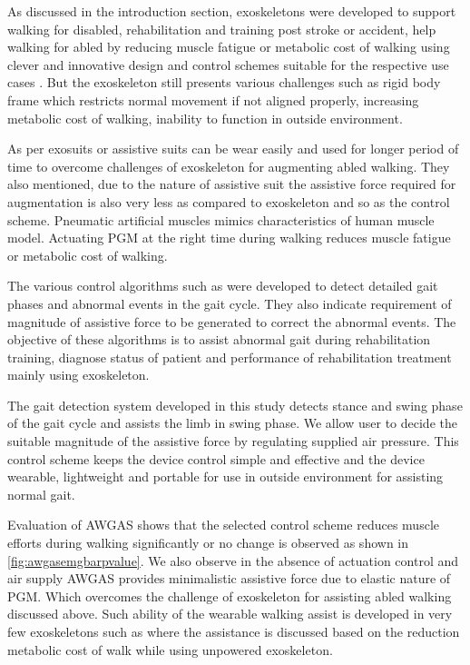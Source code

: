 \documentclass[paper,JRM,paper]{jaciiiarticle}
\begin{document}
As discussed in the introduction section, exoskeletons were developed to support walking for disabled, rehabilitation and training post stroke or accident, help walking for abled by reducing muscle fatigue or metabolic cost of walking using clever and innovative design and control schemes suitable for the respective use cases \cite{24}. But the exoskeleton still presents various challenges such as rigid body frame which restricts normal movement if not aligned properly, increasing metabolic cost of walking, inability to function in outside environment. 

As per \cite{25} exosuits or assistive suits can be wear easily and used for longer period of time to overcome challenges of exoskeleton for augmenting abled walking. They also mentioned, due to the nature of assistive suit the assistive force required for augmentation is also very less as compared to exoskeleton and so as the control scheme. Pneumatic artificial muscles mimics characteristics of human muscle model. Actuating PGM at the right time during walking reduces muscle fatigue or metabolic cost of walking.

The various control algorithms such as \cite{26,27,28} were developed to detect detailed gait phases and abnormal events in the gait cycle. They also indicate requirement of magnitude of assistive force to be generated to correct the abnormal events. The objective of these algorithms is to assist abnormal gait during rehabilitation training, diagnose status of patient and performance of rehabilitation treatment mainly using exoskeleton. 

The gait detection system developed in this study detects stance and swing phase of the gait cycle and assists the limb in swing phase. We allow user to decide the suitable magnitude of the assistive force by regulating supplied air pressure. This control scheme keeps the device control simple and effective and the device wearable, lightweight and portable for use in outside environment for assisting normal gait. 

Evaluation of AWGAS shows that the selected control scheme reduces muscle efforts during walking significantly or no change is observed as shown in \ref{fig:awgasemgbarpvalue}. We also observe in the absence of actuation control and air supply AWGAS provides minimalistic assistive force due to elastic nature of PGM. Which overcomes the challenge of exoskeleton for assisting abled walking discussed above. Such ability of the wearable walking assist is developed in very few exoskeletons such as \cite{23} where the assistance is discussed based on the reduction metabolic cost of walk while using unpowered exoskeleton. 
\end{document}
